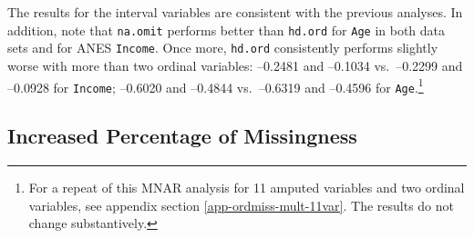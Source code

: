\documentclass[12pt,econ]{sources/authesis}
\begin{document}
The results for the interval variables are consistent with the previous analyses. In addition, note that \texttt{na.omit} performs better than \texttt{hd.ord} for \texttt{Age} in both data sets and for ANES \texttt{Income}. Once more, \texttt{hd.ord} consistently performs slightly worse with more than two ordinal variables: --0.2481 and --0.1034 vs.~--0.2299 and --0.0928 for \texttt{Income}; --0.6020 and --0.4844 vs.~--0.6319 and --0.4596 for \texttt{Age}.\footnote{For a repeat of this MNAR analysis for 11 amputed variables and two ordinal variables, see appendix section \ref{app-ordmiss-mult-11var}. The results do not change substantively.}

\clearpage

\hypertarget{ordmiss-results-increaseNA}{%
\subsection{Increased Percentage of Missingness}\label{ordmiss-results-increaseNA}}
\end{document}
